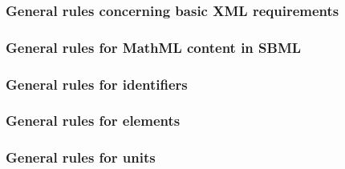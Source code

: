 \subsubsection*{General rules concerning basic XML requirements} \begin{sbmlenum}


\end{sbmlenum} \subsubsection*{General rules for MathML content in SBML} \begin{sbmlenum}


\end{sbmlenum} \subsubsection*{General rules for identifiers}  \begin{sbmlenum}


\end{sbmlenum} \subsubsection*{General rules for  elements} \begin{sbmlenum}


\end{sbmlenum} \subsubsection*{General rules for units} \begin{sbmlenum}


\end{sbmlenum}
